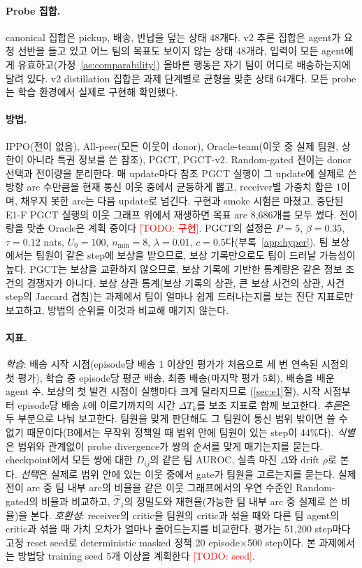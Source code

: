 \documentclass[twocolumn,10pt]{article}
\theoremstyle{remark}
\newcommand{\todo}[1]{\textcolor{red}{[TODO: #1]}}
\newcommand{\ours}{PGCT}
\begin{document}
\paragraph{Probe 집합.} canonical 집합은 pickup, 배송, 반납을 덮는 상태 48개다. v2 추론 집합은 agent가 요청 선반을 들고 있고 어느
팀의 목표도 보이지 않는 상태 48개라, 입력이 모든 agent에게 유효하고(가정~\ref{as:comparability}) 올바른 행동은 자기 팀이 어디로
배송하는지에 달려 있다. v2 distillation 집합은 과제 단계별로 균형을 맞춘 상태 64개다. 모든 probe는 학습 환경에서 실제로 구현해
확인했다.

\paragraph{방법.} IPPO(전이 없음), All-peer(모든 이웃이 donor), Oracle-team(이웃 중 실제 팀원, 상한이 아니라 특권 정보를 쓴 참조),
\ours{}, \ours{}-v2. Random-gated 전이는 donor 선택과 전이량을 분리한다. 매 update마다 참조 \ours{} 실행이 그 update에 실제로 쓴
방향 arc 수만큼을 현재 통신 이웃 중에서 균등하게 뽑고, receiver별 가중치 합은 1이며, 채우지 못한 arc는 다음 update로 넘긴다.
구현과 smoke 시험은 마쳤고, 중단된 E1-F \ours{} 실행의 이웃 그래프 위에서 재생하면 목표 arc 8{,}686개를 모두 썼다. 전이량을 맞춘
Oracle은 계획 중이다 \todo{구현}. \ours{}의 설정은 $P=5$, $\beta=0.35$, $\tau=0.12$ nats, $U_0=100$, $n_{\min}=8$,
$\lambda=0.01$, $c=0.5$다(부록~\ref{app:hyper}). 팀 보상에서는 팀원이 같은 step에 보상을 받으므로, 보상 기록만으로도 팀이
드러날 가능성이 높다. \ours{}는 보상을 교환하지 않으므로, 보상 기록에 기반한 통계량은 같은 정보 조건의 경쟁자가 아니다. 보상 상관 통계(보상 기록의
상관, 큰 보상 사건의 상관, 사건 step의 Jaccard 겹침)는 과제에서 팀이 얼마나 쉽게 드러나는지를 보는 진단 지표로만 보고하고, 방법의 순위를 이것과 비교해 매기지 않는다.

\paragraph{지표.} \emph{학습}: 배송 시작 시점(episode당 배송 1 이상인 평가가 처음으로 세 번 연속된 시점의 첫 평가), 학습 중
episode당 평균 배송, 최종 배송(마지막 평가 5회), 배송을 배운 agent 수. 보상의 첫 발견 시점이 실행마다 크게 달라지므로
(\ref{sec:e1}절), 시작 시점부터 episode당 배송 $k$에 이르기까지의 시간 $\Delta T_k$를 보조 지표로 함께 보고한다. \emph{추론}은
두 부분으로 나눠 보고한다. 팀원을 맞게 판단해도 그 팀원이 통신 범위 밖이면 쓸 수 없기 때문이다(B에서는 무작위 정책일 때 범위 안에
팀원이 있는 step이 44\%다). \emph{식별}은 범위와 관계없이 probe divergence가 쌍의 순서를 맞게 매기는지를 묻는다. checkpoint에서
모든 쌍에 대한 $D_{ij}$의 같은 팀 AUROC, 실측 마진 $\Delta$와 drift $\rho$로 본다. \emph{선택}은 실제로 범위 안에 있는 이웃 중에서
gate가 팀원을 고르는지를 묻는다. 실제 전이 arc 중 팀 내부 arc의 비율을 같은 이웃 그래프에서의 우연 수준인 Random-gated의 비율과
비교하고, $\hat{\mathcal{T}}_i$의 정밀도와 재현율(가능한 팀 내부 arc 중 실제로 쓴 비율)을 본다.
\emph{호환성}: receiver의 critic을 팀원의 critic과 섞을 때와 다른 팀 agent의 critic과 섞을 때 가치 오차가 얼마나 줄어드는지를
비교한다. 평가는 51{,}200 step마다 고정 reset seed로 deterministic masked 정책 20 episode×500 step이다. 본 과제에서는 방법당
training seed 5개 이상을 계획한다 \todo{seed}.
\end{document}
